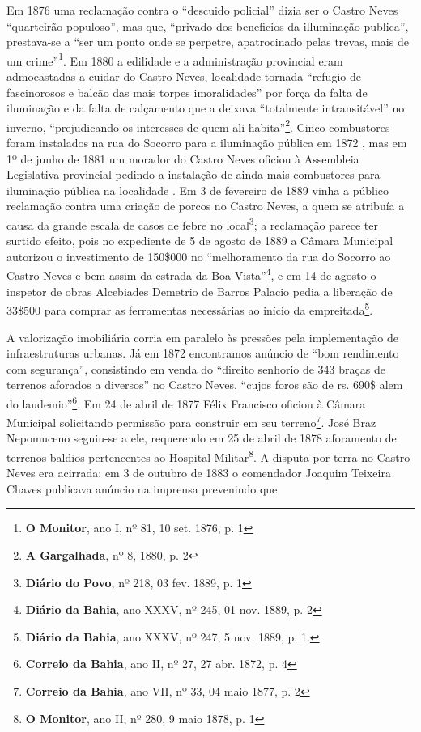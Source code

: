 Em 1876 uma reclamação contra o ``descuido policial'' dizia ser o Castro Neves ``quarteirão populoso'', mas que, ``privado dos beneficios da illuminação publica'', prestava-se a ``ser um ponto onde se perpetre, apatrocinado pelas trevas, mais de um crime''\footnote{\textbf{O Monitor}, ano I, nº 81, 10 set. 1876, p. 1}. Em 1880 a edilidade e a administração provincial eram admoeastadas a cuidar do Castro Neves, localidade tornada ``refugio de fascinorosos e balcão das mais torpes imoralidades'' por força da falta de iluminação e da falta de calçamento que a deixava ``totalmente intransitável'' no inverno, ``prejudicando os interesses de quem ali habita''\footnote{\textbf{A Gargalhada}, nº 8, 1880, p. 2}. Cinco combustores foram instalados na rua do Socorro para a iluminação pública em 1872 \cite[relat.~obras~públ.,~p.~38]{bahia_1872}, mas em 1º de junho de 1881 um morador do Castro Neves oficiou à Assembleia Legislativa provincial pedindo a instalação de ainda mais combustores para iluminação pública na localidade \cite[p.~3]{bahia_relatassleg_1881}. Em 3 de fevereiro de 1889 vinha a público reclamação contra uma criação de porcos no Castro Neves, a quem se atribuía a causa da grande escala de casos de febre no local\footnote{\textbf{Diário do Povo}, nº 218, 03 fev. 1889, p. 1}; a reclamação parece ter surtido efeito, pois no expediente de 5 de agosto de 1889 a Câmara Municipal autorizou o investimento de 150\$000 no ``melhoramento da rua do Socorro ao Castro Neves e bem assim da estrada da Boa Vista''\footnote{\textbf{Diário da Bahia}, ano XXXV, nº 245, 01 nov. 1889, p. 2}, e em 14 de agosto o inspetor de obras Alcebiades Demetrio de Barros Palacio pedia a liberação de 33\$500 para comprar as ferramentas necessárias ao início da empreitada\footnote{\textbf{Diário da Bahia}, ano XXXV, nº 247, 5 nov. 1889, p. 1.}.

A valorização imobiliária corria em paralelo às pressões pela implementação de infraestruturas urbanas. Já em 1872 encontramos anúncio de ``bom rendimento com segurança'', consistindo em venda do ``direito senhorio de 343 braças de terrenos aforados a diversos'' no Castro Neves, ``cujos foros são de rs. 690\$ alem do laudemio''\footnote{\textbf{Correio da Bahia}, ano II, nº 27, 27 abr. 1872, p. 4}. Em 24 de abril de 1877 Félix Francisco oficiou à Câmara Municipal solicitando permissão para construir em seu terreno\footnote{\textbf{Correio da Bahia}, ano VII, nº 33, 04 maio 1877, p. 2}. José Braz Nepomuceno seguiu-se a ele, requerendo em 25 de abril de 1878 aforamento de terrenos baldios pertencentes ao Hospital Militar\footnote{\textbf{O Monitor}, ano II, nº 280, 9 maio 1878, p. 1}. A disputa por terra no Castro Neves era acirrada: em 3 de outubro de 1883 o comendador Joaquim Teixeira Chaves publicava anúncio na imprensa prevenindo que 

